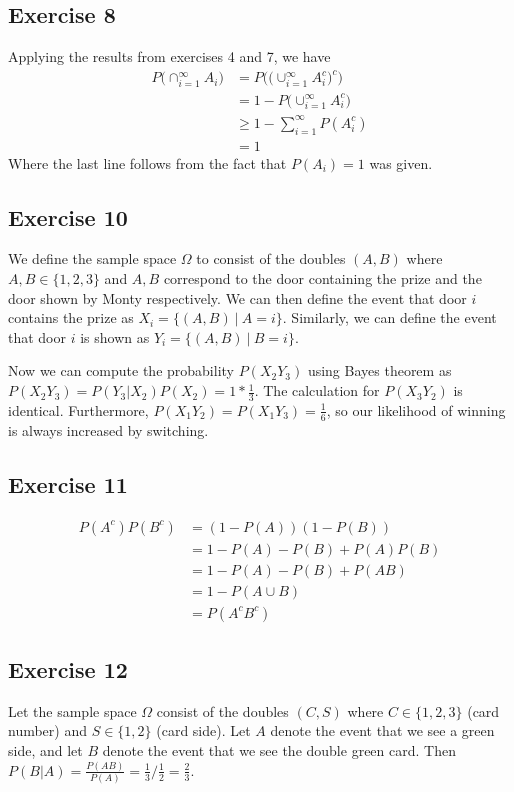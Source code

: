 \subsection{Exercise 8}
Applying the results from exercises 4 and 7, we have
\begin{align*}
        P\big(\cap_{i = 1}^\infty A_i\big) &= P\bigg(\big(\cup_{i = 1}^\infty A_i^c\big)^c\bigg) \\
                                             &= 1 - P\big(\cup_{i = 1}^\infty A_i^c\big) \\
                                             &\geq 1 - \sum_{i = 1}^\infty P(A_i^c) \\
                                             &= 1
\end{align*}
Where the last line follows from the fact that $P(A_i) = 1$ was given.

\subsection{Exercise 10}
We define the sample space $\Omega$ to consist of the doubles $(A, B)$ where
$A, B \in \{1, 2, 3\}$ and $A, B$ correspond to the door containing the prize
and the door shown by Monty respectively. We can then define the event that 
door $i$ contains the prize as $X_i = \{(A, B) \: | \: A = i\}$. Similarly,
we can define the event that door $i$ is shown as $Y_i = \{(A, B) \: | \: B = i\}$.

Now we can compute the probability $P(X_2 Y_3)$ using Bayes theorem as
$P(X_2 Y_3) = P(Y_3 | X_2) P(X_2) = 1 * \frac{1}{3}$. The calculation for
$P(X_3 Y_2)$ is identical. Furthermore, $P(X_1 Y_2) = P(X_1 Y_3) = \frac{1}{6}$, 
so our likelihood of winning is always increased by switching.

\subsection{Exercise 11}
\begin{align*}
        P(A^c) P(B^c) &= (1 - P(A)) (1 - P(B)) \\
                      &= 1 - P(A) - P(B) + P(A)P(B) \\
                      &= 1 - P(A) - P(B) + P(AB) \\
                      &= 1 - P(A \cup B) \\
                      &= P(A^c B^c)
\end{align*}

\subsection{Exercise 12}
Let the sample space $\Omega$ consist of the doubles $(C, S)$ where $C \in \{1, 2, 3\}$
(card number) and $S \in \{1, 2\}$ (card side). Let $A$ denote the event that we see
a green side, and let $B$ denote the event that we see the double green card. Then
$P(B | A) = \frac{P(AB)}{P(A)} = \frac{1}{3} / \frac{1}{2} = \frac{2}{3}$.


